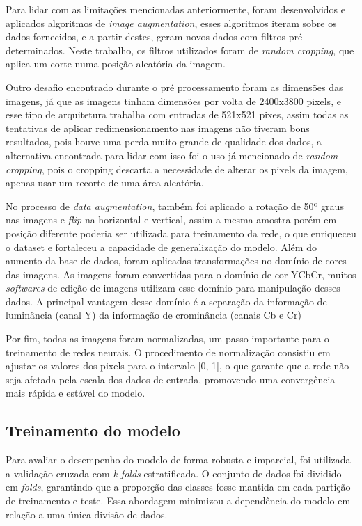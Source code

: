 Para lidar com as limitações mencionadas anteriormente, foram desenvolvidos e aplicados algoritmos de \textit{image augmentation}, esses algoritmos iteram sobre os dados fornecidos, e a partir destes, geram novos dados com filtros pré determinados. Neste trabalho, os filtros utilizados foram de \textit{random cropping}, que aplica um corte numa posição aleatória da imagem.

Outro desafio encontrado durante o pré processamento foram as dimensões das imagens, já que as imagens tinham dimensões por volta de 2400x3800 pixels, e esse tipo de arquitetura trabalha com entradas de 521x521 pixes, assim todas as tentativas de aplicar redimensionamento nas imagens não tiveram bons resultados, pois houve uma perda muito grande de qualidade dos dados, a alternativa encontrada para lidar com isso foi o uso já mencionado de \textit{random cropping}, pois o cropping descarta a necessidade de alterar os pixels da imagem, apenas usar um recorte de uma área aleatória.

No processo de \textit{data augmentation}, também foi aplicado a rotação de 50º graus nas imagens e \textit{flip} na horizontal e vertical, assim a mesma amostra porém em posição diferente poderia ser utilizada para treinamento da rede, o que enriqueceu o dataset e fortaleceu a capacidade de generalização do modelo. 
Além do aumento da base de dados, foram aplicadas transformações no domínio de cores das imagens. As imagens foram convertidas para o domínio de cor YCbCr, muitos \textit{softwares} de edição de imagens utilizam esse domínio para manipulação desses dados. A principal vantagem desse domínio é a separação da informação de luminância (canal Y) da informação de crominância (canais Cb e Cr)

Por fim, todas as imagens foram normalizadas, um passo importante para o treinamento de redes neurais. O procedimento de normalização consistiu em ajustar os valores dos pixels para o intervalo [0, 1], o que garante que a rede não seja afetada pela escala dos dados de entrada, promovendo uma convergência mais rápida e estável do modelo.

\subsection{Treinamento do modelo}

Para avaliar o desempenho do modelo de forma robusta e imparcial, foi utilizada a validação cruzada com \textit{k-folds} estratificada. O conjunto de dados foi dividido em \textit{folds}, garantindo que a proporção das classes fosse mantida em cada partição de treinamento e teste. Essa abordagem minimizou a dependência do modelo em relação a uma única divisão de dados.

